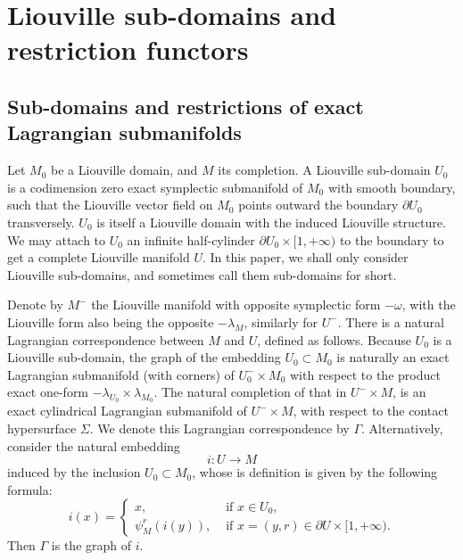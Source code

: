 \documentclass{amsart}
\numberwithin{equation}{section}
\numberwithin{figure}{section}
\begin{document}

\section{Liouville sub-domains and restriction functors}\label{section: sub-domains and the restriction functors}

\subsection{Sub-domains and restrictions of exact Lagrangian submanifolds}
	Let $M_{0}$ be a Liouville domain, and $M$ its completion. A Liouville sub-domain $U_{0}$ is a codimension zero exact symplectic submanifold of $M_{0}$ with smooth boundary, such that the Liouville vector field on $M_{0}$ points outward the boundary $\partial U_{0}$ transversely. $U_{0}$ is itself a Liouville domain with the induced Liouville structure. We may attach to $U_{0}$ an infinite half-cylinder $\partial U_{0} \times [1, +\infty)$ to the boundary to get a complete Liouville manifold $U$. In this paper, we shall only consider Liouville sub-domains, and sometimes call them sub-domains for short. \par
	Denote by $M^{-}$ the Liouville manifold with opposite symplectic form $-\omega$, with the Liouville form also being the opposite $-\lambda_{M}$, similarly for $U^{-}$. There is a natural Lagrangian correspondence between $M$ and $U$, defined as follows. Because $U_{0}$ is a Liouville sub-domain, the graph of the embedding $U_{0} \subset M_{0}$ is naturally an exact Lagrangian submanifold (with corners) of $U_{0}^{-} \times M_{0}$ with respect to the product exact one-form $-\lambda_{U_{0}} \times \lambda_{M_{0}}$. The natural completion of that in $U^{-} \times M$, is an exact cylindrical Lagrangian submanifold of $U^{-} \times M$, with respect to the contact hypersurface $\Sigma$. We denote this Lagrangian correspondence by $\Gamma$. Alternatively, consider the natural embedding
\begin{equation}
i: U \to M
\end{equation}
induced by the inclusion $U_{0} \subset M_{0}$, whose is definition is given by the following formula:
\begin{equation} \label{the natural embedding of the completion}
i(x)=
\begin{cases}
x, & \text{ if } x \in U_{0},\\
\psi_{M}^{r}(i(y)), & \text{ if } x = (y, r) \in \partial U \times [1, +\infty).
\end{cases}
\end{equation}
Then $\Gamma$ is the graph of $i$. \par
	
\end{document}
